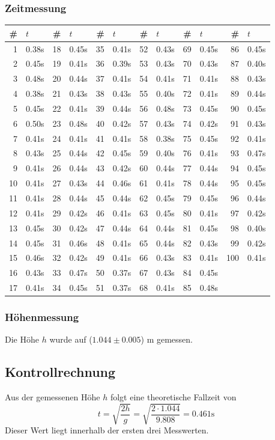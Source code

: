 \documentclass[12pt,a4paper]{article}
\begin{document}
\subsubsection*{Zeitmessung}
\begin{tabular}{|r|l|r|l|r|l|r|l|r|l|r|l|}
\hline
\#&$t$&\#&$t$&\#&$t$&\#&$t$&\#&$t$&\#&$t$\\
\hline
1&0.38s&18&0.45s&35&0.41s&52&0.43s&69&0.45s&86&0.45s\\
2&0.45s&19&0.41s&36&0.39s&53&0.43s&70&0.43s&87&0.40s\\
3&0.48s&20&0.44s&37&0.41s&54&0.41s&71&0.41s&88&0.43s\\
4&0.38s&21&0.43s&38&0.43s&55&0.40s&72&0.41s&89&0.44s\\
5&0.45s&22&0.41s&39&0.44s&56&0.48s&73&0.45s&90&0.45s\\
6&0.50s&23&0.48s&40&0.42s&57&0.43s&74&0.42s&91&0.43s\\
7&0.41s&24&0.41s&41&0.41s&58&0.38s&75&0.45s&92&0.41s\\
8&0.43s&25&0.44s&42&0.45s&59&0.40s&76&0.41s&93&0.47s\\
9&0.41s&26&0.44s&43&0.42s&60&0.44s&77&0.44s&94&0.45s\\
10&0.41s&27&0.43s&44&0.46s&61&0.41s&78&0.44s&95&0.45s\\
11&0.41s&28&0.44s&45&0.44s&62&0.45s&79&0.45s&96&0.44s\\
12&0.41s&29&0.42s&46&0.41s&63&0.45s&80&0.41s&97&0.42s\\
13&0.45s&30&0.42s&47&0.44s&64&0.44s&81&0.45s&98&0.40s\\
14&0.45s&31&0.46s&48&0.41s&65&0.44s&82&0.43s&99&0.42s\\
15&0.46s&32&0.42s&49&0.41s&66&0.43s&83&0.41s&100&0.41s\\
16&0.43s&33&0.47s&50&0.37s&67&0.43s&84&0.45s&&\\
17&0.41s&34&0.45s&51&0.37s&68&0.41s&85&0.48s&&\\
\hline
\end{tabular}

\subsubsection*{H\"ohenmessung}
Die H\"ohe $h$ wurde auf ($1.044 \pm 0.005$) m gemessen.

\subsection*{Kontrollrechnung}
Aus der gemessenen H\"ohe $h$ folgt eine theoretische Fallzeit von
\[ t = \sqrt{\frac{2h}{g}} = \sqrt{\frac{2\cdot 1.044}{9.808}} = 0.461\mbox{s} \]
Dieser Wert liegt innerhalb der ersten drei Messwerten.
\end{document}
